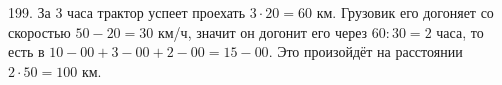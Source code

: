 199. За 3 часа трактор успеет проехать $3\cdot20=60$ км. Грузовик его догоняет со скоростью $50-20=30$ км/ч, значит он догонит его через $60:30=2$ часа, то есть в $10-00+3-00+2-00=15-00.$ Это произойдёт на расстоянии $2\cdot50=100$ км.\\
